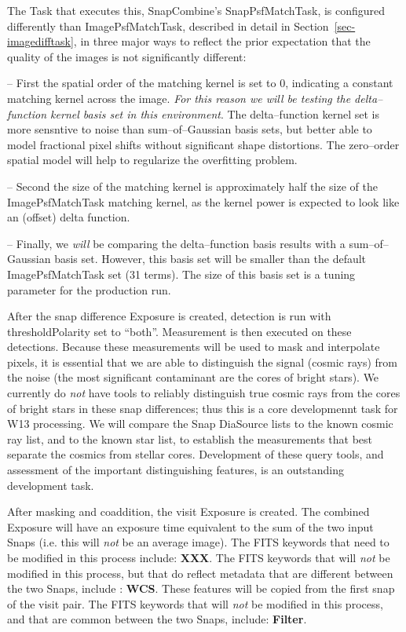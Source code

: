 \documentclass[12pt]{article}
\begin{document}
The Task that executes this, SnapCombine's SnapPsfMatchTask, is
configured differently than ImagePsfMatchTask, described in detail in
Section~\ref{sec-imagedifftask}, in three major ways to reflect the
prior expectation that the quality of the images is not significantly
different:

-- First the spatial order of the matching kernel is set to 0,
indicating a constant matching kernel across the image.  {\it For this
  reason we will be testing the delta--function kernel basis set in
  this environment}.  The delta--function kernel set is more sensntive
to noise than sum--of--Gaussian basis sets, but better able to model
fractional pixel shifts without significant shape distortions.  The
zero--order spatial model will help to regularize the overfitting
problem.

-- Second the size of the matching kernel is approximately half the
size of the ImagePsfMatchTask matching kernel, as the kernel power is
expected to look like an (offset) delta function.

-- Finally, we {\it will} be comparing the delta--function basis
results with a sum--of--Gaussian basis set.  However, this basis set
will be smaller than the default ImagePsfMatchTask set (31 terms).
The size of this basis set is a tuning parameter for the production
run.

After the snap difference Exposure is created, detection is run with
thresholdPolarity set to ``both''.  Measurement is then executed on
these detections.  Because these measurements will be used to mask and
interpolate pixels, it is essential that we are able to distinguish
the signal (cosmic rays) from the noise (the most significant
contaminant are the cores of bright stars).  We currently do {\it not}
have tools to reliably distinguish true cosmic rays from the cores of
bright stars in these snap differences; thus this is a core
developmennt task for W13 processing.  We will compare the Snap
DiaSource lists to the known cosmic ray list, and to the known star
list, to establish the measurements that best separate the cosmics
from stellar cores.  Development of these query tools, and assessment
of the important distinguishing features, is an outstanding
development task.

After masking and coaddition, the visit Exposure is created.  The
combined Exposure will have an exposure time equivalent to the sum of
the two input Snaps (i.e. this will {\it not} be an average image).
The FITS keywords that need to be modified in this process include:
{\bf XXX}.  The FITS keywords that will {\it not} be modified in this
process, but that do reflect metadata that are different between the
two Snaps, include : {\bf WCS}.  These features will be copied from
the first snap of the visit pair.  The FITS keywords that will {\it
  not} be modified in this process, and that are common between the
two Snaps, include: {\bf Filter}.
\end{document}
